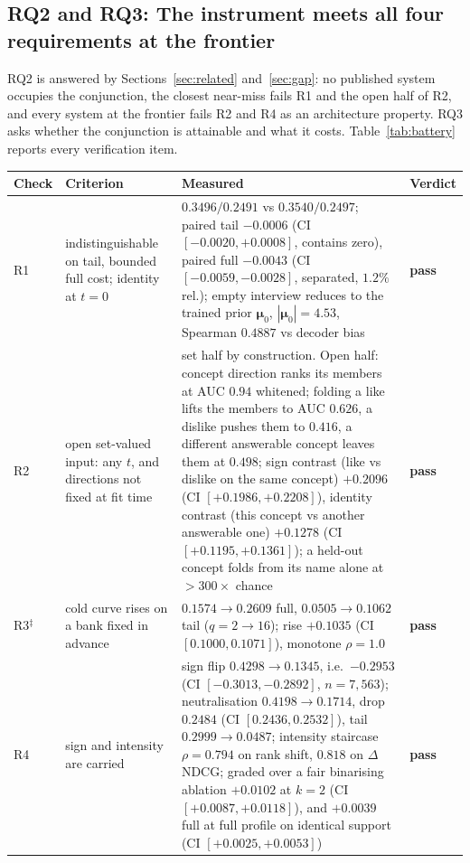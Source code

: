 \documentclass[manuscript,screen,review]{acmart}
\newcommand{\bmu}{\boldsymbol{\mu}}
\begin{document}
\subsection{RQ2 and RQ3: The instrument meets all four requirements at the frontier}\label{sec:res:battery}

RQ2 is answered by Sections~\ref{sec:related} and~\ref{sec:gap}: no published system occupies the conjunction, the closest near-miss fails R1 and the open half of R2, and every system at the frontier fails R2 and R4 as an architecture property. RQ3 asks whether the conjunction is attainable and what it costs. Table~\ref{tab:battery} reports every verification item.

\begin{table}[t]\centering\small
\setlength{\tabcolsep}{4pt}
\renewcommand{\arraystretch}{1.15}
\begin{tabular}{p{1.7cm}p{3.7cm}p{6.0cm}p{1.2cm}}
\toprule
Check & Criterion & Measured & Verdict \\
\midrule
R1 & indistinguishable on tail, bounded full cost; identity at $t{=}0$ & $0.3496/0.2491$ vs $0.3540/0.2497$; paired tail $-0.0006$ (CI $[-0.0020,+0.0008]$, contains zero), paired full $-0.0043$ (CI $[-0.0059,-0.0028]$, separated, $1.2\%$ rel.); empty interview reduces to the trained prior $\bmu_0$, $|\bmu_0|{=}4.53$, Spearman $0.4887$ vs decoder bias & \textbf{pass} \\
R2 & open set-valued input: any $t$, and directions not fixed at fit time & set half by construction. Open half: concept direction ranks its members at AUC $0.94$ whitened; folding a like lifts the members to AUC $0.626$, a dislike pushes them to $0.416$, a different answerable concept leaves them at $0.498$; sign contrast (like vs dislike on the same concept) $+0.2096$ (CI $[+0.1986,+0.2208]$), identity contrast (this concept vs another answerable one) $+0.1278$ (CI $[+0.1195,+0.1361]$); a held-out concept folds from its name alone at $>300\times$ chance & \textbf{pass} \\
R3$^\ddagger$ & cold curve rises on a bank fixed in advance & $0.1574\!\to\!0.2609$ full, $0.0505\!\to\!0.1062$ tail ($q{=}2\!\to\!16$); rise $+0.1035$ (CI $[0.1000,0.1071]$), monotone $\rho{=}1.0$ & \textbf{pass} \\
R4 & sign and intensity are carried & sign flip $0.4298\!\to\!0.1345$, i.e.\ $-0.2953$ (CI $[-0.3013,-0.2892]$, $n{=}7{,}563$); neutralisation $0.4198\!\to\!0.1714$, drop $0.2484$ (CI $[0.2436,0.2532]$), tail $0.2999\!\to\!0.0487$; intensity staircase $\rho{=}0.794$ on rank shift, $0.818$ on $\Delta$NDCG; graded over a fair binarising ablation $+0.0102$ at $k{=}2$ (CI $[+0.0087,+0.0118]$), and $+0.0039$ full at full profile on identical support (CI $[+0.0025,+0.0053]$) & \textbf{pass} \\

\end{tabular}
\end{table}
\end{document}
